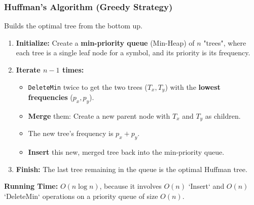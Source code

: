 \subsubsection{Huffman's Algorithm (Greedy Strategy)}
Builds the optimal tree from the bottom up.
\begin{enumerate}
    \item \textbf{Initialize:} Create a \textbf{min-priority queue} (Min-Heap) of $n$ "trees", where each tree is a single leaf node for a symbol, and its priority is its frequency.
    \item \textbf{Iterate $n-1$ times:}
    \begin{itemize}
        \item \texttt{DeleteMin} twice to get the two trees ($T_x, T_y$) with the \textbf{lowest frequencies} ($p_x, p_y$).
        \item \textbf{Merge} them: Create a new parent node with $T_x$ and $T_y$ as children.
        \item The new tree's frequency is $p_x + p_y$.
        \item \textbf{Insert} this new, merged tree back into the min-priority queue.
    \end{itemize}
    \item \textbf{Finish:} The last tree remaining in the queue is the optimal Huffman tree.
\end{enumerate}
\textbf{Running Time:} $O(n \log n)$, because it involves $O(n)$ `Insert` and $O(n)$ `DeleteMin` operations on a priority queue of size $O(n)$.


